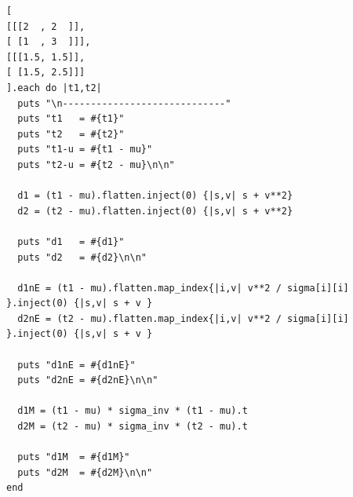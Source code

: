 \documentclass[11pt,twocolumn]{amsart} %
\begin{document}
\begin{verbatim}
[
[[[2  , 2  ]],
[ [1  , 3  ]]],
[[[1.5, 1.5]],
[ [1.5, 2.5]]]
].each do |t1,t2|
  puts "\n-----------------------------"
  puts "t1   = #{t1}"
  puts "t2   = #{t2}"
  puts "t1-u = #{t1 - mu}"
  puts "t2-u = #{t2 - mu}\n\n"

  d1 = (t1 - mu).flatten.inject(0) {|s,v| s + v**2} 
  d2 = (t2 - mu).flatten.inject(0) {|s,v| s + v**2}

  puts "d1   = #{d1}"
  puts "d2   = #{d2}\n\n"

  d1nE = (t1 - mu).flatten.map_index{|i,v| v**2 / sigma[i][i] }.inject(0) {|s,v| s + v } 
  d2nE = (t2 - mu).flatten.map_index{|i,v| v**2 / sigma[i][i] }.inject(0) {|s,v| s + v } 

  puts "d1nE = #{d1nE}"
  puts "d2nE = #{d2nE}\n\n"

  d1M = (t1 - mu) * sigma_inv * (t1 - mu).t
  d2M = (t2 - mu) * sigma_inv * (t2 - mu).t

  puts "d1M  = #{d1M}"
  puts "d2M  = #{d2M}\n\n"
end
\end{verbatim}
\end{document}
